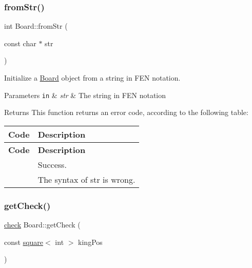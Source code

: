 \subsubsection{\texorpdfstring{from\+Str()}{fromStr()}}
{\footnotesize\ttfamily int Board\+::from\+Str (\begin{DoxyParamCaption}\item[{const char $\ast$}]{str }\end{DoxyParamCaption})\hspace{0.3cm}{\ttfamily [private]}}

Initialize a \hyperlink{classBoard}{Board} object from a string in F\+EN notation. 
\begin{DoxyParams}[1]{Parameters}
\mbox{\tt in}  & {\em str} & The string in F\+EN notation \\
\hline
\end{DoxyParams}
\begin{DoxyReturn}{Returns}
This function returns an error code, according to the following table\+: \tabulinesep=1mm
\begin{longtabu} spread 0pt [c]{*{2}{|X[-1]}|}
\hline
\rowcolor{\tableheadbgcolor}\PBS\raggedleft \textbf{ Code }&\textbf{ Description  }\\
\endfirsthead
\hline
\endfoot
\hline
\rowcolor{\tableheadbgcolor}\PBS\raggedleft \textbf{ Code }&\textbf{ Description  }\\
\endhead
\PBS{} &Success. \\
\PBS{} &The syntax of str is wrong. \\
\end{longtabu}

\end{DoxyReturn}
\mbox{\label{classBoard_afc291baf2c205a64255e8e55ffeff004}} 
\subsubsection{\texorpdfstring{get\+Check()}{getCheck()}}
{\footnotesize\ttfamily \hyperlink{structcheck}{check} Board\+::get\+Check (\begin{DoxyParamCaption}\item[{const \hyperlink{structsquare}{square}$<$ int $>$}]{king\+Pos }\end{DoxyParamCaption})\hspace{0.3cm}{\ttfamily [private]}}

